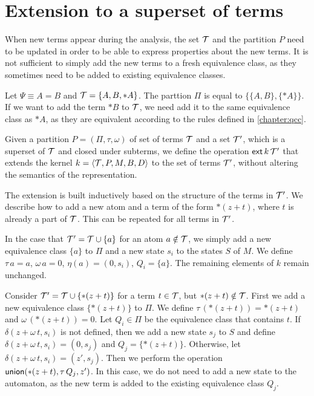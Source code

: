 \section{Extension to a superset of terms}

When new terms appear during the analysis, the set $\mathcal{T}$ and the partition $P$ need to be updated
in order to be able to express properties about the new terms.
It is not sufficient to simply add the new terms to a fresh equivalence class,
as they sometimes need to be added to existing equivalence classes.

\begin{example}
    Let $\Psi \equiv A = B$ and $\mathcal{T} = \{A, B, *A\}$.
    The parttion $\Pi$ is equal to $\{\{A, B\}, \{*A\}\}$.
    If we want to add the term $*B$ to $\mathcal{T}$, we need add it to the same equivalence class as $*A$,
    as they are equivalent according to the rules defined in \cref{chapter:qcc}.
\end{example}

Given a partition $P = (\Pi, \tau, \omega)$ of set of terms $\mathcal{T}$ and a set $\mathcal{T}'$, which is a superset of $\mathcal{T}$ and closed under subterms,
we define the operation $\textsf{ext}\,{k}\,{\mathcal{T}'}$ that extends the kernel $k = \langle\mathcal{T}, P, M, B, D\rangle$ to the set of terms $\mathcal{T}'$,
without altering the semantics of the representation.

The extension is built inductively based on the structure of the terms in $\mathcal{T}'$.
We describe how to add a new atom and a term of the form $*(z+t)$, where $t$ is already a part of $\mathcal{T}$.
This can be repeated for all terms in $\mathcal{T}'$.

In the case that $\mathcal{T}' = \mathcal{T} \cup \{a\}$ for an atom $a \notin \mathcal{T}$, we simply add a new
equivalence class $\{a\}$ to $\Pi$ and a new state $s_i$ to the states $S$ of $M$.
We define $\tau\,a = a$, $\omega\,a=0$, $\eta(a) = (0,s_i)$, $Q_i = \{a\}$.
The remaining elements of $k$ remain unchanged.

Consider $\mathcal{T}' = \mathcal{T} \cup \{*(z+t)\}$ for a term $t \in \mathcal{T}$, but $*(z + t) \notin \mathcal{T}$.
First we add a new equivalence class $\{*(z+t)\}$ to $\Pi$.
We define $\tau\,(*(z+t)) = *(z+t)$ and $\omega\,(*(z+t))=0$.
Let $Q_i \in \Pi$ be the equivalence class that contains $t$.
If $\delta(z + \omega\,t,s_i)$ is not defined, then we add a new state $s_j$ to $S$
and define $\delta(z + \omega\,t, s_i) = (0, s_j)$ and $Q_j = \{*(z+t)\}$.
Otherwise, let $\delta(z + \omega\,t, s_i) = (z', s_j)$.
Then we perform the operation $\textsf{union}(*(z + t), \tau\,Q_j, z')$.
In this case, we do not need to add a new state to the automaton,
as the new term is added to the existing equivalence class $Q_j$.
